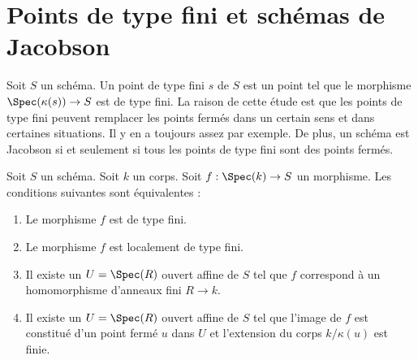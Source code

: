 \section{Points de type fini et schémas de Jacobson}
\label{section-points-finite-type}

\noindent
Soit $S$ un schéma. Un point de type fini $s$ de $S$
est un point tel que le morphisme $\Spec(\kappa(s)) \to S$ est de type fini. La raison
de cette étude est que les points de type fini peuvent remplacer les
points fermés dans un certain sens et dans certaines situations.
Il y en a toujours assez par exemple. De plus, un schéma est Jacobson
si et seulement si tous les points de type fini sont des points fermés.

\begin{lemma}
\label{lemma-point-finite-type}
Soit $S$ un schéma. Soit $k$ un corps.
Soit $f : \Spec(k) \to S$ un morphisme. Les conditions
suivantes sont équivalentes :
\begin{enumerate}
\item Le morphisme $f$ est de type fini.
\item Le morphisme $f$ est localement de type fini.
\item Il existe un $U = \Spec(R)$ ouvert affine de $S$ tel que
$f$ correspond à un homomorphisme d'anneaux fini $R \to k$.
\item Il existe un $U = \Spec(R)$ ouvert affine de $S$ tel que
l'image de $f$ est constitué d'un point fermé $u$ dans $U$
et l'extension du corps $k/\kappa(u)$ est finie.
\end{enumerate}
\end{lemma}


